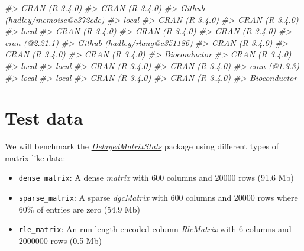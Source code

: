 \documentclass[]{book}
\newenvironment{Shaded}{\begin{snugshade}}{\end{snugshade}}
\newcommand{\CommentTok}[1]{\textcolor[rgb]{0.56,0.35,0.01}{\textit{#1}}}
\providecommand{\tightlist}{%
  \setlength{\itemsep}{0pt}\setlength{\parskip}{0pt}}
\begin{document}
\begin{Shaded}
\begin{Highlighting}[]
\CommentTok{#>  CRAN (R 3.4.0)                   }
\CommentTok{#>  CRAN (R 3.4.0)                   }
\CommentTok{#>  Github (hadley/memoise@e372cde)  }
\CommentTok{#>  local                            }
\CommentTok{#>  CRAN (R 3.4.0)                   }
\CommentTok{#>  CRAN (R 3.4.0)                   }
\CommentTok{#>  local                            }
\CommentTok{#>  CRAN (R 3.4.0)                   }
\CommentTok{#>  CRAN (R 3.4.0)                   }
\CommentTok{#>  CRAN (R 3.4.0)                   }
\CommentTok{#>  cran (@2.21.1)                   }
\CommentTok{#>  Github (hadley/rlang@c351186)    }
\CommentTok{#>  CRAN (R 3.4.0)                   }
\CommentTok{#>  CRAN (R 3.4.0)                   }
\CommentTok{#>  CRAN (R 3.4.0)                   }
\CommentTok{#>  Bioconductor                     }
\CommentTok{#>  CRAN (R 3.4.0)                   }
\CommentTok{#>  local                            }
\CommentTok{#>  local                            }
\CommentTok{#>  CRAN (R 3.4.0)                   }
\CommentTok{#>  CRAN (R 3.4.0)                   }
\CommentTok{#>  cran (@1.3.3)                    }
\CommentTok{#>  local                            }
\CommentTok{#>  local                            }
\CommentTok{#>  CRAN (R 3.4.0)                   }
\CommentTok{#>  CRAN (R 3.4.0)                   }
\CommentTok{#>  Bioconductor}
\end{Highlighting}
\end{Shaded}

\chapter{Test data}\label{test_data}

We will benchmark the
\emph{\href{https://github.com/PeteHaitch/DelayedMatrixStats}{DelayedMatrixStats}}
package using different types of matrix-like data:

\begin{itemize}
\tightlist
\item
  \texttt{dense\_matrix}: A dense \emph{matrix} with 600 columns and
  20000 rows (91.6 Mb)
\item
  \texttt{sparse\_matrix}: A sparse \emph{dgcMatrix} with 600 columns
  and 20000 rows where 60\% of entries are zero (54.9 Mb)
\item
  \texttt{rle\_matrix}: An run-length encoded column \emph{RleMatrix}
  with 6 columns and 2000000 rows (0.5 Mb)
\end{itemize}
\end{document}

